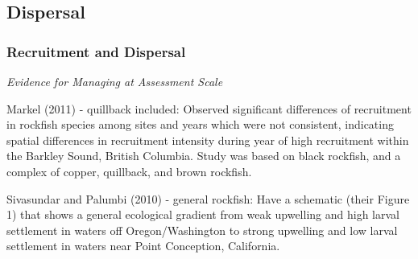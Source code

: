 \documentclass[11pt,
  english,
  letterpaper,
]{article}
\begin{document}
\leavevmode\tagmcend\tagstructend


\hypertarget{dispersal}{%
\subsection{Dispersal}\label{dispersal}}

\leavevmode\tagmcend\tagstructend


\hypertarget{recruitment-and-dispersal}{%
\subsubsection{Recruitment and Dispersal}\label{recruitment-and-dispersal}}

\leavevmode\tagmcend\tagstructend


\emph{Evidence for Managing at Assessment Scale}

\leavevmode\tagmcend\tagstructend\par


Markel {(2011)\leavevmode\tagmcend\tagstructend} - quillback included: Observed significant differences of recruitment in rockfish species among sites and years which were not consistent, indicating spatial differences in recruitment intensity during year of high recruitment within the Barkley Sound, British Columbia. Study was based on black rockfish, and a complex of copper, quillback, and brown rockfish.

\leavevmode\tagmcend\tagstructend\par


Sivasundar and Palumbi {(2010)\leavevmode\tagmcend\tagstructend} - general rockfish: Have a schematic (their Figure 1) that shows a general ecological gradient from weak upwelling and high larval settlement in waters off Oregon/Washington to strong upwelling and low larval settlement in waters near Point Conception, California.

\leavevmode\tagmcend\tagstructend\par
\end{document}
